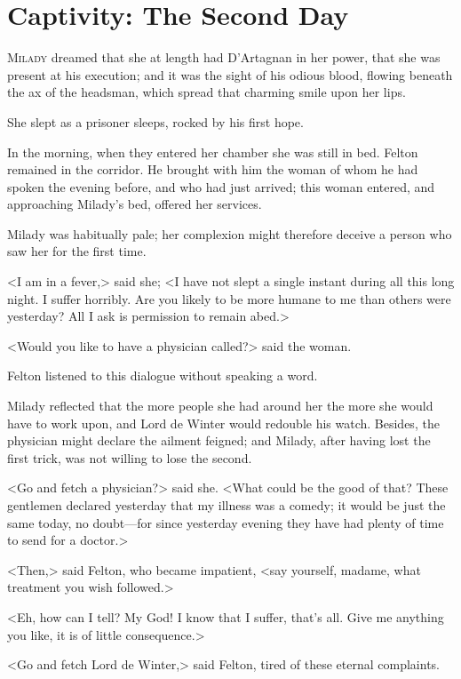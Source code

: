 
\chapter{Captivity: The Second Day}

\lettrine{M}{ilady} dreamed that she at length had D'Artagnan in her power, that she was present at his execution; and it was the sight of his odious blood, flowing beneath the ax of the headsman, which spread that charming smile upon her lips. 

\zz
She slept as a prisoner sleeps, rocked by his first hope. 

In the morning, when they entered her chamber she was still in bed. Felton remained in the corridor. He brought with him the woman of whom he had spoken the evening before, and who had just arrived; this woman entered, and approaching Milady's bed, offered her services. 

Milady was habitually pale; her complexion might therefore deceive a person who saw her for the first time. 

<I am in a fever,> said she; <I have not slept a single instant during all this long night. I suffer horribly. Are you likely to be more humane to me than others were yesterday? All I ask is permission to remain abed.> 

<Would you like to have a physician called?> said the woman. 

Felton listened to this dialogue without speaking a word. 

Milady reflected that the more people she had around her the more she would have to work upon, and Lord de Winter would redouble his watch. Besides, the physician might declare the ailment feigned; and Milady, after having lost the first trick, was not willing to lose the second. 

<Go and fetch a physician?> said she. <What could be the good of that? These gentlemen declared yesterday that my illness was a comedy; it would be just the same today, no doubt—for since yesterday evening they have had plenty of time to send for a doctor.> 

<Then,> said Felton, who became impatient, <say yourself, madame, what treatment you wish followed.> 

<Eh, how can I tell? My God! I know that I suffer, that's all. Give me anything you like, it is of little consequence.> 

<Go and fetch Lord de Winter,> said Felton, tired of these eternal complaints. 

